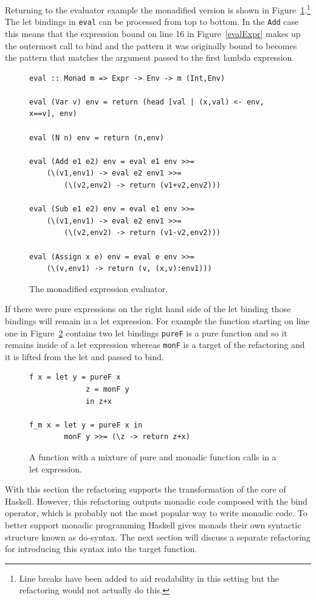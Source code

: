 Returning to the evaluator example the monadified version is shown in Figure~\ref{monEval}.\footnote{Line breaks have been added to aid readability in this setting but the refactoring would not actually do this.} The let bindings in \texttt{eval} can be processed from top to bottom. In the \texttt{Add} case this means that the expression bound on line 16 in Figure~\ref{evalExpr} makes up the outermost call to bind and the pattern it was originally bound to becomes the pattern that matches the argument passed to the first lambda expression. 
\begin{figure}[t]
\begin{lstlisting}
eval :: Monad m => Expr -> Env -> m (Int,Env)

eval (Var v) env = return (head [val | (x,val) <- env, x==v], env)

eval (N n) env = return (n,env)

eval (Add e1 e2) env = eval e1 env >>= 
	(\(v1,env1) -> eval e2 env1 >>= 
		(\(v2,env2) -> return (v1+v2,env2)))

eval (Sub e1 e2) env = eval e1 env >>= 
	(\(v1,env1) -> eval e2 env1 >>= 
		(\(v2,env2) -> return (v1-v2,env2)))

eval (Assign x e) env = eval e env >>= 
	(\(v,env1) -> return (v, (x,v):env1)))
\end{lstlisting}
\caption{The monadified expression evaluator.}
\label{monEval}
\end{figure}

If there were pure expressions on the right hand side of the let binding those bindings will remain in a let expression. For example the function starting on line one in Figure~\ref{mixLet} contains two let bindings \texttt{pureF} is a pure function and so it remains inside of a let expression whereas \texttt{monF} is a target of the refactoring and it is lifted from the let and passed to bind. 

\begin{figure}[t]
\begin{lstlisting}
f x = let y = pureF x
             z = monF y
		     in z+x

f_m x = let y = pureF x in
		monF y >>= (\z -> return z+x)
\end{lstlisting}
\caption{A function with a mixture of pure and monadic function calls in a let expression.}
\label{mixLet}
\end{figure}

With this section the refactoring supports the transformation of the core of Haskell. However, this refactoring outputs monadic code composed with the bind operator, which is probably not the most popular way to write monadic code. To better support monadic programming Haskell gives monads their own syntactic structure known as do-syntax. The next section will discuss a separate refactoring for introducing this syntax into the target function.

